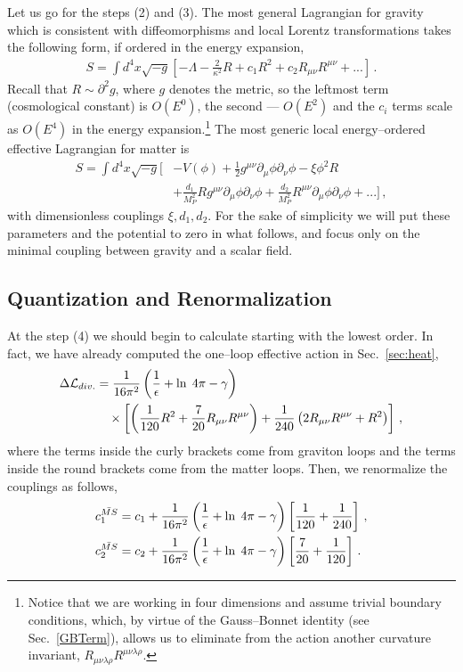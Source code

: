\documentclass[12pt]{article}
\newcommand{\be}{\begin{equation}}
\newcommand{\ee}{\end{equation}}
\newcommand\m{\mu}
\newcommand\n{\nu}
\renewcommand\r{\rho}
\renewcommand\l{\lambda}
\def\d{\partial}
\renewcommand{\ln}{\mathop{\rm ln}\nolimits}
\begin{document}
Let us go for the steps (2) and (3).
The most general Lagrangian for gravity
which is consistent with diffeomorphisms and local Lorentz
transformations takes the following form, if ordered in the energy expansion,
\be
\begin{split}
S=\int d^4x\sqrt{-g}\left[-\Lambda -\frac{2}{\kappa^2}R+c_1 R^2+c_2 R_{\m\n}R^{\m\n}+...\right]\,.
\end{split}
\ee
Recall that $R\sim \d^2 g$, where $g$ denotes the metric, so the leftmost term (cosmological constant) is $O(E^0)$, the second --- $O(E^2)$ and the $c_i$ terms scale as $O(E^4)$ in the
energy expansion.\footnote{Notice that we are working in four dimensions and assume trivial
boundary conditions, which, by virtue of the Gauss--Bonnet identity (see Sec.~\ref{GBTerm}), allows us to eliminate from the action another curvature invariant,
$R_{\mu\nu\l \r}R^{\mu\nu\l \r}$.
}
The most generic local energy--ordered effective Lagrangian for matter is
\be
\begin{split}
S=\int d^4x\sqrt{-g}\biggl[&-V(\phi)+\frac{1}{2}g^{\m\n}\d_\m\phi\d_\n\phi-\xi \phi^2 R\\
&+\frac{d_1}{M_P^2}Rg^{\m\n}\d_\m\phi\d_\n\phi+\frac{d_2}{M_P^2}R^{\m\n}\d_\m\phi\d_\n\phi
+...\biggr] \,,
\end{split}
\ee
with dimensionless couplings $\xi,d_1,d_2$. 
For the sake of simplicity we will put these parameters and the potential to zero in
what follows, and focus only on the minimal coupling between gravity and a scalar field.

\subsection{Quantization and Renormalization}

At the step (4) we  should begin to calculate starting with the lowest order. In fact, we have already computed
the one--loop effective action in Sec.~\ref{sec:heat},
\be
\begin{split}
\Delta \mathcal{L}_{div.} & = \frac{1}{16\pi^2} \left(\frac{1}{\epsilon}+\ln \;4\pi-\gamma\right)\\
&\quad \times \left[\left(\frac{1}{120}R^2+\frac{7}{20}R_{\m\n}R^{\m\n}\right)+\frac{1}{240}\left(2R_{\m\n}R^{\m\n}+R^2\right)\right]\,,
\end{split}
\ee
where the terms inside the curly brackets come from graviton loops and the terms inside the round brackets come from the matter loops. Then, we renormalize the couplings as follows,
\be
\begin{split}
& c_1^{\bar{MS}}=c_1+\frac{1}{16\pi^2} \left(\frac{1}{\epsilon}+\ln \;4\pi-\gamma\right)\left[\frac{1}{120}+\frac{1}{240}\right]\,,\\
& c_2^{\bar{MS}}=c_2+\frac{1}{16\pi^2} \left(\frac{1}{\epsilon}+\ln \;4\pi-\gamma\right)\left[\frac{7}{20}+\frac{1}{120}\right]\,.
\end{split}
\ee
\end{document}
